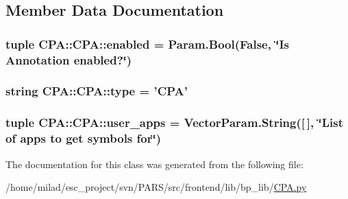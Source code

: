 \subsection{Member Data Documentation}
\hypertarget{classCPA_1_1CPA_aa51fc369b2c6374a7e8528ebcefebad8}{
\subsubsection[{enabled}]{\setlength{\rightskip}{0pt plus 5cm}tuple {\bf CPA::CPA::enabled} = Param.Bool(False, \char`\"{}Is Annotation {\bf enabled}?\char`\"{})}}
\label{classCPA_1_1CPA_aa51fc369b2c6374a7e8528ebcefebad8}
\hypertarget{classCPA_1_1CPA_acdfeaa8a4e65e395f0625cbb0003d6d9}{
\subsubsection[{type}]{\setlength{\rightskip}{0pt plus 5cm}string {\bf CPA::CPA::type} = '{\bf CPA}'}}
\label{classCPA_1_1CPA_acdfeaa8a4e65e395f0625cbb0003d6d9}
\hypertarget{classCPA_1_1CPA_a81ba328a54b3af6462493b928a9656f5}{
\subsubsection[{user\_\-apps}]{\setlength{\rightskip}{0pt plus 5cm}tuple {\bf CPA::CPA::user\_\-apps} = VectorParam.String(\mbox{[}$\,$\mbox{]}, \char`\"{}List of apps to get symbols for\char`\"{})}}
\label{classCPA_1_1CPA_a81ba328a54b3af6462493b928a9656f5}


The documentation for this class was generated from the following file:\begin{DoxyCompactItemize}
\item 
/home/milad/esc\_\-project/svn/PARS/src/frontend/lib/bp\_\-lib/\hyperlink{CPA_8py}{CPA.py}\end{DoxyCompactItemize}
